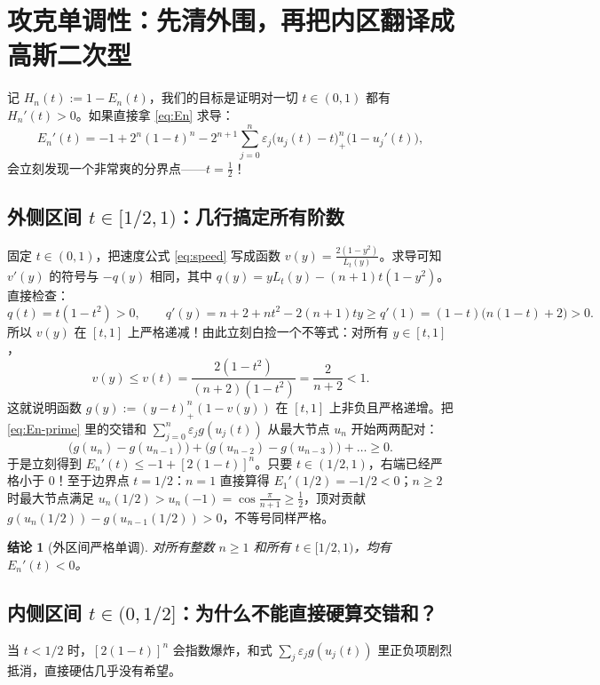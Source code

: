 \documentclass[UTF8,fontset=windows,a4paper,11pt]{ctexart}
\newtheorem{claim}{结论}
\begin{document}
\section{攻克单调性：先清外围，再把内区翻译成高斯二次型}
\label{sec:setup}

记 $H_n(t):=1-E_n(t)$，我们的目标是证明对一切 $t\in(0,1)$ 都有 $H_n'(t)>0$。如果直接拿 \eqref{eq:En} 求导：
\begin{equation}
    E_n'(t) = -1 + 2^n(1-t)^n - 2^{n+1}\sum_{j=0}^{n}\varepsilon_j\bigl(u_j(t)-t\bigr)_+^n\bigl(1-u_j'(t)\bigr),
    \label{eq:En-prime}
\end{equation}
会立刻发现一个非常爽的分界点——$t=\frac12$！

\subsection*{外侧区间 $t\in[1/2,1)$：几行搞定所有阶数}

固定 $t\in(0,1)$，把速度公式 \eqref{eq:speed} 写成函数 $v(y)=\frac{2(1-y^2)}{L_t(y)}$。求导可知 $v'(y)$ 的符号与 $-q(y)$ 相同，其中 $q(y)=yL_t(y)-(n+1)t(1-y^2)$。直接检查：
\[
    q(t)=t(1-t^2)>0, \qquad
    q'(y)=n+2+nt^2-2(n+1)ty \ge q'(1)=(1-t)\bigl(n(1-t)+2\bigr)>0.
\]
所以 $v(y)$ 在 $[t,1]$ 上严格递减！由此立刻白捡一个不等式：对所有 $y\in[t,1]$，
\[
    v(y)\le v(t)=\frac{2(1-t^2)}{(n+2)(1-t^2)}=\frac{2}{n+2}<1.
\]
这就说明函数 $g(y):=(y-t)_+^n(1-v(y))$ 在 $[t,1]$ 上非负且严格递增。把 \eqref{eq:En-prime} 里的交错和 $\sum_{j=0}^n \varepsilon_j g(u_j(t))$ 从最大节点 $u_n$ 开始两两配对：
\[
    \bigl(g(u_n)-g(u_{n-1})\bigr)+\bigl(g(u_{n-2})-g(u_{n-3})\bigr)+\dots \ge 0.
\]
于是立刻得到 $E_n'(t)\le -1+[2(1-t)]^n$。只要 $t\in(1/2,1)$，右端已经严格小于 $0$！至于边界点 $t=1/2$：$n=1$ 直接算得 $E_1'(1/2)=-1/2<0$；$n\ge 2$ 时最大节点满足 $u_n(1/2)>u_n(-1)=\cos\frac{\pi}{n+1}\ge\frac12$，顶对贡献 $g(u_n(1/2))-g(u_{n-1}(1/2))>0$，不等号同样严格。

\begin{claim}[外区间严格单调]
    \label{clm:outer}
    对所有整数 $n\ge 1$ 和所有 $t\in[1/2,1)$，均有 $E_n'(t)<0$。
\end{claim}

\subsection*{内侧区间 $t\in(0,1/2]$：为什么不能直接硬算交错和？}

当 $t<1/2$ 时，$[2(1-t)]^n$ 会指数爆炸，和式 $\sum_j\varepsilon_j g(u_j(t))$ 里正负项剧烈抵消，直接硬估几乎没有希望。
\end{document}
